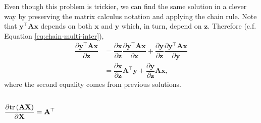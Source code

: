 \documentclass{article}
\newcommand{\trans}{\top}
\begin{document}
Even though this problem is trickier, we can find the same solution in a clever way by preserving the matrix calculus notation and applying the chain rule. Note that \(\mathbf{y}^\trans \mathbf{A} \mathbf{x}\) depends on both \(\mathbf{x}\) and \(\mathbf{y}\) which, in turn, depend on \(\mathbf{z}\). Therefore (c.f. Equation \eqref{eq:chain-multi-inter}),
\begin{align}
    \dfrac{\partial \mathbf{y}^\trans \mathbf{A} \mathbf{x}}{\partial \mathbf{z}} & = \dfrac{\partial \mathbf{x}}{\partial \mathbf{z}} \dfrac{\partial \mathbf{y}^\trans \mathbf{A} \mathbf{x}}{\partial \mathbf{x}} + \dfrac{\partial \mathbf{y}}{\partial \mathbf{z}} \dfrac{\partial \mathbf{y}^\trans \mathbf{A} \mathbf{x}}{\partial \mathbf{y}} \\
    & = \dfrac{\partial \mathbf{x}}{\partial \mathbf{z}} \mathbf{A}^{\trans} \mathbf{y} + \dfrac{\partial \mathbf{y}}{\partial \mathbf{z}} \mathbf{A} \mathbf{x},
\end{align}
where the second equality comes from previous solutions.

\subsection{\(\dfrac{\partial \textnormal{tr}\left(\mathbf{A} \mathbf{X}\right)}{\partial \mathbf{X}} = \mathbf{A}^\trans\)}
\end{document}
